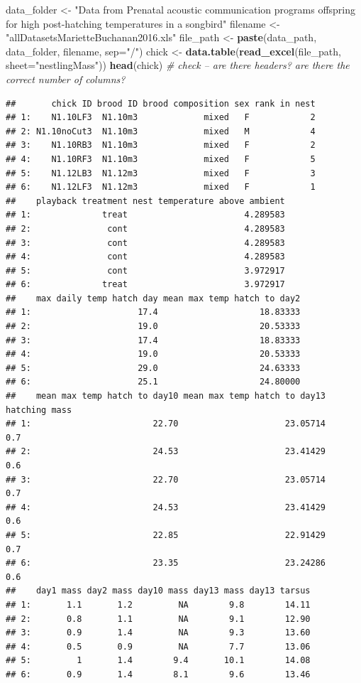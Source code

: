 \documentclass[]{book}
\newenvironment{Shaded}{\begin{snugshade}}{\end{snugshade}}
\newcommand{\KeywordTok}[1]{\textcolor[rgb]{0.13,0.29,0.53}{\textbf{#1}}}
\newcommand{\DataTypeTok}[1]{\textcolor[rgb]{0.13,0.29,0.53}{#1}}
\newcommand{\StringTok}[1]{\textcolor[rgb]{0.31,0.60,0.02}{#1}}
\newcommand{\CommentTok}[1]{\textcolor[rgb]{0.56,0.35,0.01}{\textit{#1}}}
\newcommand{\NormalTok}[1]{#1}
\theoremstyle{definition}
\theoremstyle{definition}
\theoremstyle{definition}
\theoremstyle{remark}
\begin{document}
\begin{Shaded}
\begin{Highlighting}[]
\NormalTok{data_folder <-}\StringTok{ "Data from Prenatal acoustic communication programs offspring for high post-hatching temperatures in a songbird"}
\NormalTok{filename <-}\StringTok{ "allDatasetsMarietteBuchanan2016.xls"}
\NormalTok{file_path <-}\StringTok{ }\KeywordTok{paste}\NormalTok{(data_path, data_folder, filename, }\DataTypeTok{sep=}\StringTok{"/"}\NormalTok{)}
\NormalTok{chick <-}\StringTok{ }\KeywordTok{data.table}\NormalTok{(}\KeywordTok{read_excel}\NormalTok{(file_path, }\DataTypeTok{sheet=}\StringTok{"nestlingMass"}\NormalTok{))}
\KeywordTok{head}\NormalTok{(chick) }\CommentTok{# check -- are there headers? are there the correct number of columns?}
\end{Highlighting}
\end{Shaded}

\begin{verbatim}
##       chick ID brood ID brood composition sex rank in nest
## 1:    N1.10LF3  N1.10m3             mixed   F            2
## 2: N1.10noCut3  N1.10m3             mixed   M            4
## 3:    N1.10RB3  N1.10m3             mixed   F            2
## 4:    N1.10RF3  N1.10m3             mixed   F            5
## 5:    N1.12LB3  N1.12m3             mixed   F            3
## 6:    N1.12LF3  N1.12m3             mixed   F            1
##    playback treatment nest temperature above ambient
## 1:              treat                       4.289583
## 2:               cont                       4.289583
## 3:               cont                       4.289583
## 4:               cont                       4.289583
## 5:               cont                       3.972917
## 6:              treat                       3.972917
##    max daily temp hatch day mean max temp hatch to day2
## 1:                     17.4                    18.83333
## 2:                     19.0                    20.53333
## 3:                     17.4                    18.83333
## 4:                     19.0                    20.53333
## 5:                     29.0                    24.63333
## 6:                     25.1                    24.80000
##    mean max temp hatch to day10 mean max temp hatch to day13 hatching mass
## 1:                        22.70                     23.05714           0.7
## 2:                        24.53                     23.41429           0.6
## 3:                        22.70                     23.05714           0.7
## 4:                        24.53                     23.41429           0.6
## 5:                        22.85                     22.91429           0.7
## 6:                        23.35                     23.24286           0.6
##    day1 mass day2 mass day10 mass day13 mass day13 tarsus
## 1:       1.1       1.2         NA        9.8        14.11
## 2:       0.8       1.1         NA        9.1        12.90
## 3:       0.9       1.4         NA        9.3        13.60
## 4:       0.5       0.9         NA        7.7        13.06
## 5:         1       1.4        9.4       10.1        14.08
## 6:       0.9       1.4        8.1        9.6        13.46
\end{verbatim}
\end{document}
